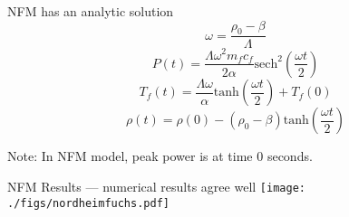 \documentclass[serif]{beamer}
\begin{document}
\begin{frame}{NFM has an analytic solution}
  \begin{equation}
    \nonumber
    \omega = \frac{\rho_0 - \beta}{\Lambda}
    \end{equation}
\vfill
  \begin{equation}
    \nonumber
    P\left(t\right) = \frac{\Lambda\omega^2m_fc_f}{2\alpha}\mathrm{sech}^2\left(\frac{\omega t}{2}\right)
  \end{equation}
\vfill
  \begin{equation}
    \nonumber
    T_f\left(t\right) = \frac{\Lambda\omega}{\alpha}\mathrm{tanh}\left(\frac{\omega t}{2}\right) + T_f\left(0\right)
  \end{equation}
\vfill
  \begin{equation}
    \nonumber
    \rho\left(t\right) = \rho\left(0\right) - \left(\rho_0 - \beta\right)\mathrm{tanh}\left(\frac{\omega t}{2}\right)
  \end{equation}
\vfill
  \begin{center}
    \alert{Note:} In NFM model, peak power is at time 0 seconds.
  \end{center}
\end{frame}

\begin{frame}{NFM Results --- numerical results agree well}
  \texttt{[image: ./figs/nordheimfuchs.pdf]}
\end{frame}
\end{document}
